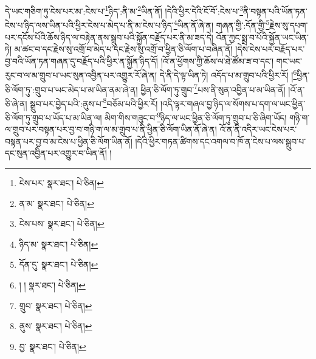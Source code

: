 དེ་ཡང་གཅིག་ཏུ་ངེས་པར་མ་:ངེས་པ་\footnote{ངེས་པར་  སྣར་ཐང་།  པེ་ཅིན། }ཉིད་:ནི་མ་\footnote{ན་མ་  སྣར་ཐང་།  པེ་ཅིན། }ཡིན་ནོ། །དེའི་ཕྱིར་དེའི་ངོ་བོ་:ངེས་པ་\footnote{ངེས་པས་  སྣར་ཐང་།  པེ་ཅིན། }ནི་བསྟན་པའི་ཡོན་ཏན་ངེས་པ་ཉིད་ལས་ཡིན་པའི་ཕྱིར་ངེས་པ་མེད་པ་ནི་མ་ངེས་པ་ཉིད་\footnote{ཉིད་མ་  སྣར་ཐང་།  པེ་ཅིན། }ཡིན་ནོ་ཞེ་ན། གཞན་གྱི་:དོན་གྱི་\footnote{དོན་དུ་  སྣར་ཐང་།  པེ་ཅིན། }རྗེས་སུ་དཔག་པར་དངོས་པོའི་ཆོས་ཉིད་ལ་བརྟེན་ནས་སྒྲུབ་པའི་སྐྱོན་བརྗོད་པར་ནི་མ་ཟད་དེ། འོན་ཀྱང་སྨྲ་བ་པོའི་སྐྱོན་ཡང་ཡིན་ཏེ། མ་ཚང་བ་དང་རྗེས་སུ་འགྲོ་བ་མེད་པ་དང་རྗེས་སུ་འགྲོ་བ་ཕྱིན་ཅི་ལོག་པ་བཞིན་ནོ། །དེས་ངེས་པར་བརྗོད་པར་བྱ་བའི་ཡོན་ཏན་གཞན་དུ་བརྗོད་པའི་ཕྱིར་ན་སྐྱོན་ཉིད་དོ། །འོ་ན་ཕྱོགས་ཀྱི་ཆོས་ལ་ཐེ་ཚོམ་ཟ་བ་དང་། གང་ཡང་རུང་བ་ལ་མ་གྲུབ་པ་ཡང་སུན་འབྱིན་པར་འགྱུར་རོ་ཞེ་ན། དེ་ནི་དེ་ལྟ་ཡིན་ཏེ། འདོད་པ་མ་གྲུབ་པའི་ཕྱིར་རོ། །\footnote{། །   སྣར་ཐང་།  པེ་ཅིན། }ཕྱིན་ཅི་ལོག་ཏུ་:གྲུབ་པ་ཡང་མེད་པ་མ་ཡིན་ནམ་ཞེ་ན། ཕྱིན་ཅི་ལོག་ཏུ་གྲུབ་\footnote{གྲུབ་  སྣར་ཐང་།  པེ་ཅིན། }པས་ནི་སུན་འབྱིན་པ་མ་ཡིན་ནོ། །འོ་ན་ཅི་ཞེ་ན། སྒྲུབ་པར་བྱེད་པའི་:ནུས་པ་\footnote{ནུས་  སྣར་ཐང་།  པེ་ཅིན། }བཅོམ་པའི་ཕྱིར་རོ། །འདི་ལྟར་གཞལ་བྱ་ཉིད་ལ་སོགས་པ་དག་ལ་ཡང་ཕྱིན་ཅི་ལོག་ཏུ་གྲུབ་པ་ཡོད་པ་མ་ཡིན་ལ། མིག་གིས་གཟུང་བ་\footnote{བྱ་  སྣར་ཐང་།  པེ་ཅིན། }ཉིད་ལ་ཡང་ཕྱིན་ཅི་ལོག་ཏུ་གྲུབ་པ་ཅི་ཞིག་ཡོད། གཉི་ག་ལ་གྲུབ་པར་བསྟན་པར་བྱ་བ་གཉི་ག་ལ་མ་གྲུབ་པ་ནི་ཕྱིན་ཅི་ལོག་ཡིན་ནོ་ཞེ་ན། འོ་ན་ནི་འདིར་ཡང་ངེས་པར་བསྟན་པར་བྱ་བ་མ་ངེས་པ་ཕྱིན་ཅི་ལོག་ཡིན་ནོ། །དེའི་ཕྱིར་གཏན་ཚིགས་དང་འགལ་བ་ཁོ་ན་ངེས་པ་ལས་སྒྲུབ་པ་དང་སུན་འབྱིན་པར་འགྱུར་བ་ཡིན་ནོ། །
